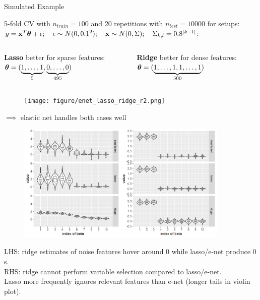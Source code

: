 \documentclass[11pt,compress,t,notes=noshow, xcolor=table]{beamer}
\begin{document}
\begin{vbframe} {Simulated Example}

\footnotesize
5-fold CV with $n_{train}=100$ and 20 repetitions with $n_{test}=10000$ for setups: $y =\mathbf{x}^T \bm{\theta} + \epsilon; \quad \epsilon \sim N(0,0.1^2);
  \quad \mathbf{x} \sim N(0, \Sigma); \quad\Sigma_{k,l}=0.8^{|k-l|}$: 
\vspace{-0.3cm}
\begin{columns}
\begin{column}{0.5\textwidth}
\begin{center}
{\footnotesize \textbf{Lasso} better for sparse features:} \\ 
$\bm{\theta}=(\underbrace{1,\ldots,1}_{5},\underbrace{0,\ldots,0}_{495})$\\
  \end{center}
\end{column}
\begin{column}{0.5\textwidth} 
\begin{center}
{\footnotesize \textbf{Ridge} better for dense features:} \\
$\bm{\theta}=(\underbrace{1,\ldots,1,1,\ldots,1}_{500})$ \\
\end{center}
\end{column}
\end{columns}

\begin{figure}
\texttt{[image: figure/enet\_lasso\_ridge\_r2.png]}\\
\end{figure}
{\normalsize $\implies$ elastic net handles both cases well}
\framebreak

\begin{figure}
\includegraphics[width=0.9\textwidth]{figure/enet_tradeoff.png}\\
\end{figure}


\footnotesize
LHS: ridge estimates of noise features hover around $0$ while lasso/e-net produce $0$s. \\
RHS: ridge cannot perform variable selection compared to lasso/e-net. \\
Lasso more frequently ignores relevant features than e-net (longer tails in violin plot).\\

\end{vbframe}
\end{document}
